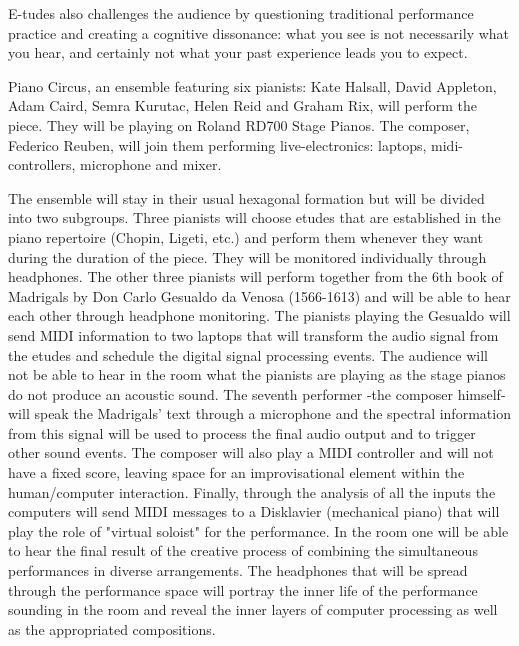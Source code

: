 E-tudes also challenges the audience by questioning traditional performance practice and creating a cognitive dissonance: what you see is not necessarily what you hear, and certainly not what your past experience leads you to expect.

	Piano Circus, an ensemble featuring six pianists: Kate Halsall, David Appleton, Adam Caird, Semra Kurutac, Helen Reid and Graham Rix, will perform the piece. They will be playing on Roland RD700 Stage Pianos. The composer, Federico Reuben, will join them performing live-electronics: laptops, midi-controllers, microphone and mixer. 

	The ensemble will stay in their usual hexagonal formation but will be divided into two subgroups. Three pianists will choose etudes that are established in the piano repertoire (Chopin, Ligeti, etc.) and perform them whenever they want during the duration of the piece. They will be monitored individually through headphones. The other three pianists will perform together from the 6th book of Madrigals by Don Carlo Gesualdo da Venosa (1566-1613) and will be able to hear each other through headphone monitoring. The pianists playing the Gesualdo will send MIDI information to two laptops that will transform the audio signal from the etudes and schedule the digital signal processing events. The audience will not be able to hear in the room what the pianists are playing as the stage pianos do not produce an acoustic sound. The seventh performer -the composer himself- will speak the Madrigals' text through a microphone and the spectral information from this signal will be used to process the final audio output and to trigger other sound events. The composer will also play a MIDI controller and will not have a fixed score, leaving space for an improvisational element within the human/computer interaction. Finally, through the analysis of all the inputs the computers will send MIDI messages to a Disklavier (mechanical piano) that will play the role of "virtual soloist" for the performance. In the room one will be able to hear the final result of the creative process of combining the simultaneous performances in diverse arrangements. The headphones that will be spread through the performance space will portray the inner life of the performance sounding in the room and reveal the inner layers of computer processing as well as the appropriated compositions.

